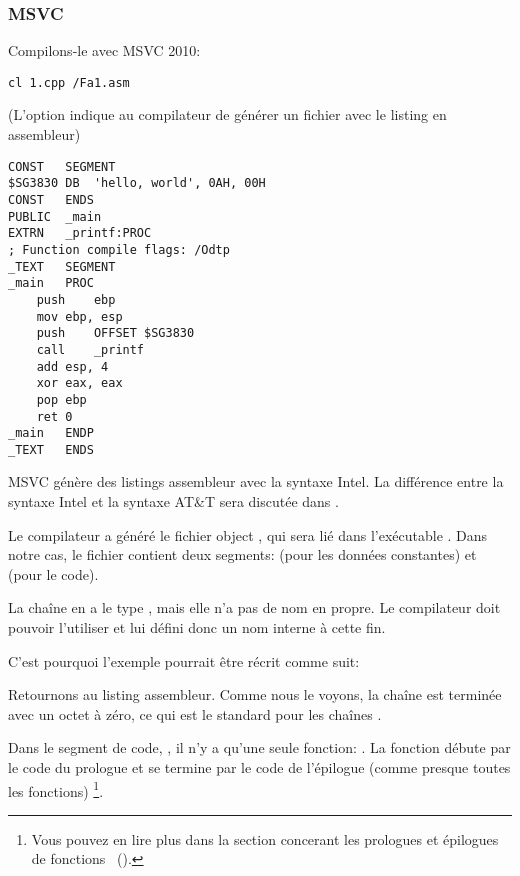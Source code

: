 \subsubsection{MSVC}

Compilons-le avec MSVC 2010:

\begin{lstlisting}
cl 1.cpp /Fa1.asm
\end{lstlisting}

(L'option  indique au compilateur de générer un fichier avec le listing en assembleur)

\begin{lstlisting}[caption=MSVC 2010,style=customasmx86]
CONST	SEGMENT
$SG3830	DB	'hello, world', 0AH, 00H
CONST	ENDS
PUBLIC	_main
EXTRN	_printf:PROC
; Function compile flags: /Odtp
_TEXT	SEGMENT
_main	PROC
	push	ebp
	mov	ebp, esp
	push	OFFSET $SG3830
	call	_printf
	add	esp, 4
	xor	eax, eax
	pop	ebp
	ret	0
_main	ENDP
_TEXT	ENDS
\end{lstlisting}

MSVC génère des listings assembleur avec la syntaxe Intel.
La différence entre la syntaxe Intel et la syntaxe AT\&T sera discutée dans .

Le compilateur a généré le fichier object , qui sera lié dans l'exécutable .
Dans notre cas, le fichier contient deux segments:  (pour les données constantes)
 et  (pour le code).

\label{string_is_const_char}
La chaîne  en \CCpp a le type , mais
elle n'a pas de nom en propre.
Le compilateur doit pouvoir l'utiliser et lui défini donc un nom interne  à cette fin.

C'est pourquoi l'exemple pourrait être récrit comme suit:



Retournons au listing assembleur. Comme nous le voyons, la chaîne est terminée avec un octet à zéro, ce qui
est le standard pour les chaînes \CCpp.

Dans le segment de code, , il n'y a qu'une seule fonction: \main{}.
La fonction \main débute par le code du prologue et se termine par le code de l'épilogue 
(comme presque toutes les fonctions)
\footnote{Vous pouvez en lire plus dans la section concerant les prologues et épilogues de
fonctions ~().}.

